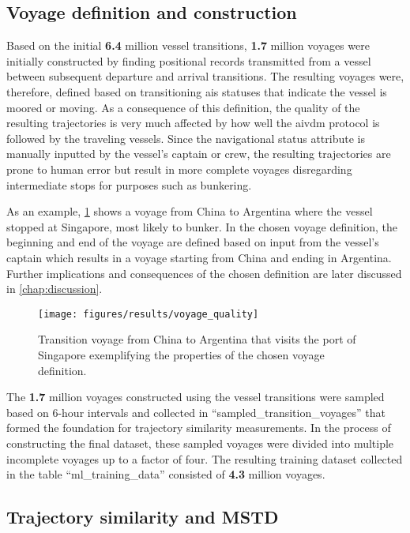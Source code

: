 \subsection{Voyage definition and construction}
\label{sec:results_voyage_definition}

Based on the initial \textbf{6.4} million vessel transitions, \textbf{1.7} million voyages were initially constructed by finding positional records transmitted from a vessel between subsequent departure and arrival transitions. The resulting voyages were, therefore, defined based on transitioning \acrshort{ais} statuses that indicate the vessel is moored or moving. As a consequence of this definition, the quality of the resulting trajectories is very much affected by how well the \gls{aivdm} protocol is followed by the traveling vessels. Since the navigational status attribute is manually inputted by the vessel's captain or crew, the resulting trajectories are prone to human error but result in more complete voyages disregarding intermediate stops for purposes such as bunkering.

As an example, \cref{fig:transition_voyage} shows a voyage from China to Argentina where the vessel stopped at Singapore, most likely to bunker. In the chosen voyage definition, the beginning and end of the voyage are defined based on input from the vessel's captain which results in a voyage starting from China and ending in Argentina. Further implications and consequences of the chosen definition are later discussed in \cref{chap:discussion}.

\begin{figure}[htbp]
    \centering
    \texttt{[image: figures/results/voyage\_quality]}
    \caption{Transition voyage from China to Argentina that visits the port of Singapore exemplifying the properties of the chosen voyage definition.}
    \label{fig:transition_voyage}
\end{figure}

The \textbf{1.7} million voyages constructed using the vessel transitions were sampled based on 6-hour intervals and collected in ``sampled\_transition\_voyages'' that formed the foundation for trajectory similarity measurements. In the process of constructing the final dataset, these sampled voyages were divided into multiple incomplete voyages up to a factor of four. The resulting training dataset collected in the table ``ml\_training\_data'' consisted of \textbf{4.3} million voyages.

\subsection{Trajectory similarity and MSTD}

